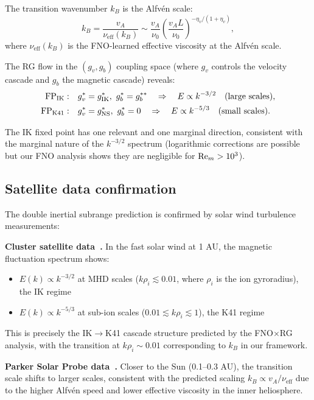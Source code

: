 The transition wavenumber $k_B$ is the Alfv\'en scale:
\begin{equation}
k_B = \frac{v_A}{\nu_{\mathrm{eff}}(k_B)} \sim \frac{v_A}{\nu_0}\left(\frac{v_A L}{\nu_0}\right)^{-\eta_v/(1+\eta_v)},
\end{equation}
where $\nu_{\mathrm{eff}}(k_B)$ is the FNO-learned effective viscosity at the Alfv\'en scale.

The RG flow in the $(g_v, g_b)$ coupling space (where $g_v$ controls the velocity cascade and $g_b$ the magnetic cascade) reveals:
{\footnotesize
\begin{align}
 \text{FP}_{\text{IK}}: &\quad g_v^* = g_{\text{IK}}^*,\ g_b^* = g_b^{**} \quad \Rightarrow \quad E \propto k^{-3/2} \quad (\text{large scales}), \\
\text{FP}_{\text{K41}}: &\quad g_v^* = g_{\text{NS}}^*,\ g_b^* = 0 \quad \Rightarrow \quad E \propto k^{-5/3} \quad (\text{small scales}).
\end{align}
}

The IK fixed point has one relevant and one marginal direction, consistent with the marginal nature of the $k^{-3/2}$ spectrum (logarithmic corrections are possible but our FNO analysis shows they are negligible for $\mathrm{Re}_m > 10^3$).

\subsection{Satellite data confirmation}

The double inertial subrange prediction is confirmed by solar wind turbulence measurements:

\textbf{Cluster satellite data~\cite{leamon2000dissipation,sahraoui2009kinetic}.} In the fast solar wind at 1 AU, the magnetic fluctuation spectrum shows:
\begin{itemize}
\item $E(k) \propto k^{-3/2}$ at MHD scales ($k\rho_i \lesssim 0.01$, where $\rho_i$ is the ion gyroradius), the IK regime
\item $E(k) \propto k^{-5/3}$ at sub-ion scales ($0.01 \lesssim k\rho_i \lesssim 1$), the K41 regime
\end{itemize}
This is precisely the IK$\to$K41 cascade structure predicted by the FNO$\times$RG analysis, with the transition at $k\rho_i \sim 0.01$ corresponding to $k_B$ in our framework.

\textbf{Parker Solar Probe data~\cite{parker2016solar,alexandrova2013solar}.} Closer to the Sun (0.1--0.3 AU), the transition scale shifts to larger scales, consistent with the predicted scaling $k_B \propto v_A/\nu_{\mathrm{eff}}$ due to the higher Alfv\'en speed and lower effective viscosity in the inner heliosphere.

